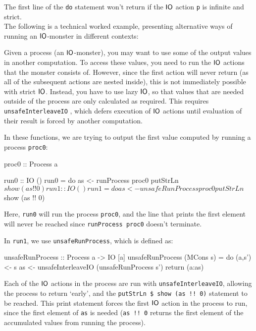 
The first line of the \verb+do+ statement won't return if the $\mathsf{IO}$ action \verb+p+ is infinite and strict. \\

The following is a technical worked example, presenting alternative ways of running an $\mathsf{IO}$-monster in different contexts: 

Given a process (an $\mathsf{IO}$-monster), you may want to use some of the output values in another computation. To access these values, you need to run the $\mathsf{IO}$ actions that the monster consists of. However, since the first action will never return (as all of the subsequent actions are nested inside), this is not immediately possible with strict $\mathsf{IO}$. Instead, you have to use lazy $\mathsf{IO}$, so that values that are needed outside of the process are only calculated as required. This requires \verb+unsafeInterleaveIO+ \cite{unsafe_io}, which defers execution of $\mathsf{IO}$ actions until evaluation of their result is forced by another computation. 

In these functions, we are trying to output the first value computed by running a process \verb+proc0+:

\begin{haskell}
proc0 :: Process a

run0 :: IO ()
run0 = do as <- runProcess proc0
          putStrLn $ show (as !! 0)

run1 :: IO ()
run1 = do as <- unsafeRunProcess proc0
          putStrLn $ show (as !! 0)
\end{haskell}

Here, \verb+run0+ will run the process \verb+proc0+, and the line that prints the first element will never be reached since \verb+runProcess proc0+ doesn't terminate.

In \verb+run1+, we use \verb+unsafeRunProcess+, which is defined as:

\begin{haskell}
unsafeRunProcess :: Process a -> IO [a]
unsafeRunProcess (MCons s) = 
	do (a,s') <- s
	   as     <- unsafeInterleaveIO (unsafeRunProcess s')
	   return (a:as)
\end{haskell}

Each of the $\mathsf{IO}$ actions in the process are run with \verb+unsafeInterleaveIO+, allowing the process to return `early', and the \verb+putStrLn $ show (as !! 0)+ statement to be reached. This print statement forces the first $\mathsf{IO}$ action in the process to run, since the first element of \verb+as+ is needed (\verb+as !! 0+ returns the first element of the accumulated values from running the process).

